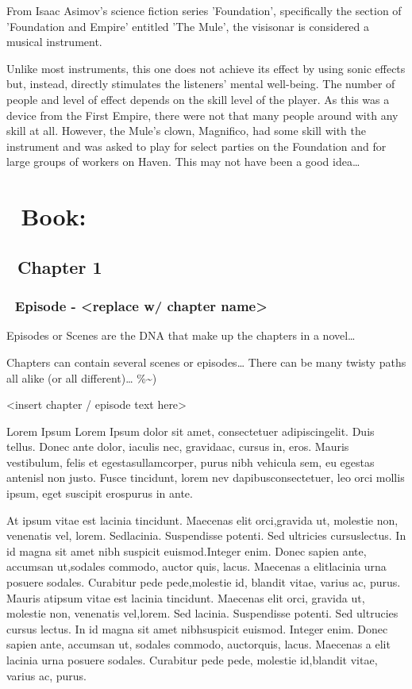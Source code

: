\documentclass[11pt]{article}
\begin{document}
From Isaac Asimov's science fiction series 'Foundation', specifically the section of 'Foundation and Empire' entitled 'The Mule', the visisonar is considered a musical instrument.

Unlike most instruments, this one does not achieve its effect by using sonic effects but, instead, directly stimulates the listeners' mental well-being. The number of people and level of effect depends on the skill level of the player. As this was a device from the First Empire, there were not that many people around with any skill at all. However, the Mule's clown, Magnifico, had some skill with the instrument and was asked to play for select parties on the Foundation and for large groups of workers on Haven. This may not have been a good idea\ldots{}
\section{📖 Book:}
\label{sec:orgc1cd57c}
\subsection{🔖 Chapter 1}
\label{sec:orgf4a9b31}

\subsubsection{📄 Episode - <replace w/ chapter name>}
\label{sec:orgf7a33fb}
Episodes or Scenes are the DNA that make up the chapters in a novel\ldots{}  

Chapters can contain several scenes or episodes\ldots{} There can be many twisty paths all alike (or all different)\ldots{} \%\textasciitilde{})

<insert chapter / episode text here>

Lorem Ipsum Lorem Ipsum dolor sit amet, consectetuer adipiscingelit. Duis tellus. Donec ante dolor, iaculis nec, gravidaac, cursus in, eros. Mauris vestibulum, felis et egestasullamcorper, purus nibh vehicula sem, eu egestas antenisl non justo. Fusce tincidunt, lorem nev dapibusconsectetuer, leo orci mollis ipsum, eget suscipit erospurus in ante. 

At ipsum vitae est lacinia tincidunt. Maecenas elit orci,gravida ut, molestie non, venenatis vel, lorem. Sedlacinia. Suspendisse potenti. Sed ultricies cursuslectus. In id magna sit amet nibh suspicit euismod.Integer enim. Donec sapien ante, accumsan ut,sodales commodo, auctor quis, lacus. Maecenas a elitlacinia urna posuere sodales. Curabitur pede pede,molestie id, blandit vitae, varius ac, purus. Mauris atipsum vitae est lacinia tincidunt. Maecenas elit orci, gravida ut, molestie non, venenatis vel,lorem. Sed lacinia. Suspendisse potenti. Sed ultrucies cursus lectus. In id magna sit amet nibhsuspicit euismod. Integer enim. Donec sapien ante, accumsan ut, sodales commodo, auctorquis, lacus. Maecenas a elit lacinia urna posuere sodales. Curabitur pede pede, molestie id,blandit vitae, varius ac, purus.
\end{document}
